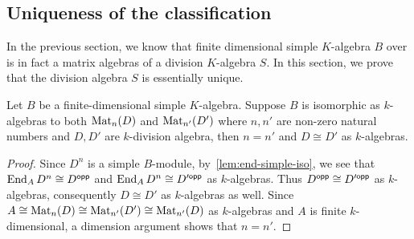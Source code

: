 \subsection{Uniqueness of the classification}\label{sec:wed-artin-unique}
In the previous section, we know that finite dimensional simple $K$-algebra $B$ over is in fact a matrix algebras of a division $K$-algebra $S$. In this section, we prove that the division algebra $S$ is essentially unique.

\begin{theorem} Let $B$ be a finite-dimensional simple $K$-algebra. Suppose $B$ is isomorphic as $k$-algebras to both $\operatorname{Mat}_{n}(D)$ and $\operatorname{Mat}_{n'}(D')$ where $n, n'$ are non-zero natural numbers and $D, D'$ are $k$-division algebra, then $n = n'$ and $D \cong D'$ as $k$-algebras.\label{thm:wed-artin-unique}
  \leanok
\end{theorem}

\begin{proof}
  Since $D^{n}$ is a simple $B$-module, by~\cref{lem:end-simple-iso}, we see that $\operatorname{End}_{A}D^{n}\cong D^{\mathsf{opp}}$ and $\operatorname{End}_{A}D^{n}\cong D'^{\mathsf{opp}}$ as $k$-algebras. Thus $D^{\mathsf{opp}}\cong D'^{\mathsf{opp}}$ as $k$-algebras, consequently $D\cong D'$ as $k$-algebras as well. Since $A \cong \operatorname{Mat}_{n}(D)\cong \operatorname{Mat}_{n'}(D')\cong \operatorname{Mat}_{n'}(D)$ as $k$-algebras and $A$ is finite $k$-dimensional, a dimension argument shows that $n=n'$.
\end{proof}

